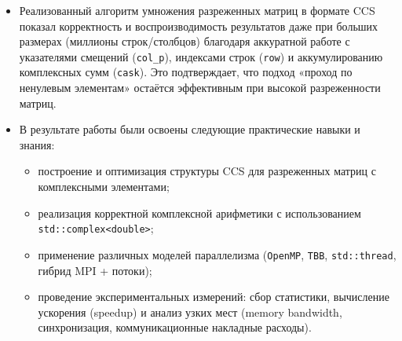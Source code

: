 \documentclass[12pt]{article}
\begin{document}
\begin{itemize}
  \item Реализованный алгоритм умножения разреженных матриц в формате CCS показал корректность и воспроизводимость результатов даже при больших размерах (миллионы строк/столбцов) благодаря аккуратной работе с указателями смещений (\texttt{col\_p}), индексами строк (\texttt{row}) и аккумулированию комплексных сумм (\texttt{cask}). Это подтверждает, что подход «проход по ненулевым элементам» остаётся эффективным при высокой разреженности матриц.
  
  \item В результате работы были освоены следующие практические навыки и знания:
    \begin{itemize}
      \item построение и оптимизация структуры CCS для разреженных матриц с комплексными элементами;
      \item реализация корректной комплексной арифметики с использованием \texttt{std::complex<double>};
      \item применение различных моделей параллелизма (\texttt{OpenMP}, \texttt{TBB}, \texttt{std::thread}, гибрид MPI + потоки);
      \item проведение экспериментальных измерений: сбор статистики, вычисление ускорения (speedup) и анализ узких мест (memory bandwidth, синхронизация, коммуникационные накладные расходы).
    \end{itemize}
\end{itemize}

\newpage
\end{document}
